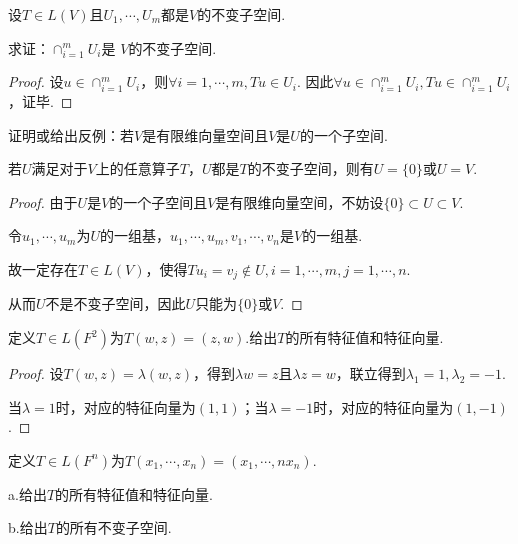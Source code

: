 \begin{problem}[5]\label{5.A.5}
    设\(T \in L(V)\)且\(U_1,\cdots,U_m\)都是\(V\)的不变子空间.

    求证：\(\cap_{i=1}^m U_i\)是 \(V\)的不变子空间.
\end{problem}

\begin{proof}
    设\(u \in \cap_{i=1}^m U_i\)，则\(\forall i=1,\cdots,m,Tu \in U_i\).
    因此\(\forall u \in \cap_{i=1}^m U_i,Tu \in \cap_{i=1}^m U_i\)，证毕.
\end{proof}

\begin{problem}[6]\label{5.A.6}
    证明或给出反例：若\(V\)是有限维向量空间且\(V\)是\(U\)的一个子空间.

    若\(U\)满足对于\(V\)上的任意算子\(T\)，\(U\)都是\(T\)的不变子空间，则有\(U=\{0\}\)或\(U=V\).
\end{problem}

\begin{proof}
    由于\(U\)是\(V\)的一个子空间且\(V\)是有限维向量空间，不妨设\(\{0\} \subset U \subset V\).

    令\(u_1,\cdots,u_m\)为\(U\)的一组基，\(u_1,\cdots,u_m,v_1,\cdots,v_n\)是\(V\)的一组基.
    
    故一定存在\(T \in L(V)\)，使得\(Tu_i=v_j \notin U,i=1,\cdots,m,j=1,\cdots,n\).
    
    从而\(U\)不是不变子空间，因此\(U\)只能为\(\{0\}\)或\(V\).
\end{proof}

\begin{problem}[8]\label{5.A.8}
    定义\(T \in L(F^2)\)为\(T(w,z)=(z,w)\).给出\(T\)的所有特征值和特征向量.
\end{problem}

\begin{proof}
    设\(T(w,z)=\lambda(w,z)\)，得到\(\lambda w=z\)且\(\lambda z=w\)，联立得到\(\lambda_1=1,\lambda_2=-1\).

    当\(\lambda=1\)时，对应的特征向量为\((1,1)\)；当\(\lambda=-1\)时，对应的特征向量为\((1,-1)\).
\end{proof}

\newpage

\begin{problem}[10]\label{5.A.10}
    定义\(T \in L(F^n)\)为\(T(x_1,\cdots,x_n)=(x_1,\cdots,nx_n)\).

    a.给出\(T\)的所有特征值和特征向量.
    
    b.给出\(T\)的所有不变子空间.
\end{problem}

